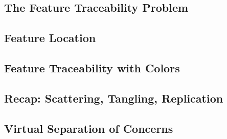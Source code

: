 \subsection{The Feature Traceability Problem}
\begin{frame}{\insertsubsection}
	\begin{mycolumns}
		\todots
	\mynextcolumn
		\todots
	\end{mycolumns}
\end{frame}

\subsection{Feature Location}
\begin{frame}{\insertsubsection}
	\begin{mycolumns}
		\todots
	\mynextcolumn
		\todots
	\end{mycolumns}
\end{frame}

\subsection{Feature Traceability with Colors}
\begin{frame}{\insertsubsection}
	\begin{mycolumns}
		\todots
	\mynextcolumn
		\todots
	\end{mycolumns}
\end{frame}

\subsection{Recap: Scattering, Tangling, Replication}
\begin{frame}{\insertsubsection}
	\begin{mycolumns}
		\todots
	\mynextcolumn
		\todots
	\end{mycolumns}
\end{frame}

\subsection{Virtual Separation of Concerns}
